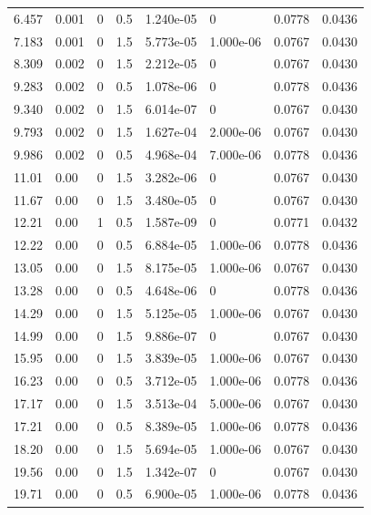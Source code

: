 \documentclass[preview]{standalone}
\begin{document}
{{\begin{tabular}{L{1.2cm}C{1.2cm} C{0.3cm}C{0.5cm} C{1.4cm}C{1.4cm} C{1.4cm}C{1.4cm}}
  6.457  &  0.001  & 0     & 0.5 &  1.240e-05  & 0  & 0.0778 &  0.0436   \\ 
  7.183  &  0.001  & 0     & 1.5 &  5.773e-05  & 1.000e-06  & 0.0767 &  0.0430   \\ 
  8.309  &  0.002  & 0     & 1.5 &  2.212e-05  & 0  & 0.0767 &  0.0430   \\ 
  9.283  &  0.002  & 0     & 0.5 &  1.078e-06  & 0  & 0.0778 &  0.0436   \\ 
  9.340  &  0.002  & 0     & 1.5 &  6.014e-07  & 0  & 0.0767 &  0.0430   \\ 
  9.793  &  0.002  & 0     & 1.5 &  1.627e-04  & 2.000e-06  & 0.0767 &  0.0430   \\ 
  9.986  &  0.002  & 0     & 0.5 &  4.968e-04  & 7.000e-06  & 0.0778 &  0.0436   \\ 
  11.01  &  0.00  & 0     & 1.5 &  3.282e-06  & 0  & 0.0767 &  0.0430   \\ 
  11.67  &  0.00  & 0     & 1.5 &  3.480e-05  & 0  & 0.0767 &  0.0430   \\ 
  12.21  &  0.00  & 1     & 0.5 &  1.587e-09  & 0  & 0.0771 &  0.0432   \\ 
  12.22  &  0.00  & 0     & 0.5 &  6.884e-05  & 1.000e-06  & 0.0778 &  0.0436   \\ 
  13.05  &  0.00  & 0     & 1.5 &  8.175e-05  & 1.000e-06  & 0.0767 &  0.0430   \\ 
  13.28  &  0.00  & 0     & 0.5 &  4.648e-06  & 0  & 0.0778 &  0.0436   \\ 
  14.29  &  0.00  & 0     & 1.5 &  5.125e-05  & 1.000e-06  & 0.0767 &  0.0430   \\ 
  14.99  &  0.00  & 0     & 1.5 &  9.886e-07  & 0  & 0.0767 &  0.0430   \\ 
  15.95  &  0.00  & 0     & 1.5 &  3.839e-05  & 1.000e-06  & 0.0767 &  0.0430   \\ 
  16.23  &  0.00  & 0     & 0.5 &  3.712e-05  & 1.000e-06  & 0.0778 &  0.0436   \\ 
  17.17  &  0.00  & 0     & 1.5 &  3.513e-04  & 5.000e-06  & 0.0767 &  0.0430   \\ 
  17.21  &  0.00  & 0     & 0.5 &  8.389e-05  & 1.000e-06  & 0.0778 &  0.0436   \\ 
  18.20  &  0.00  & 0     & 1.5 &  5.694e-05  & 1.000e-06  & 0.0767 &  0.0430   \\ 
  19.56  &  0.00  & 0     & 1.5 &  1.342e-07  & 0  & 0.0767 &  0.0430   \\ 
  19.71  &  0.00  & 0     & 0.5 &  6.900e-05  & 1.000e-06  & 0.0778 &  0.0436   \\ 

\end{tabular}}}
\end{document}

